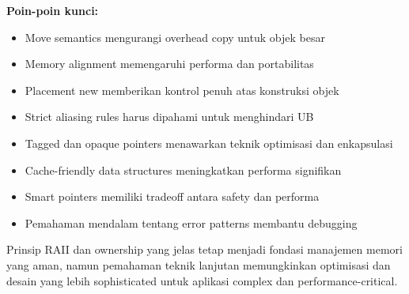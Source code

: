\documentclass[../main.tex]{subfiles}
\begin{document}
\textbf{Poin-poin kunci:}
\begin{itemize}
  \item Move semantics mengurangi overhead copy untuk objek besar
  \item Memory alignment memengaruhi performa dan portabilitas
  \item Placement new memberikan kontrol penuh atas konstruksi objek
  \item Strict aliasing rules harus dipahami untuk menghindari UB
  \item Tagged dan opaque pointers menawarkan teknik optimisasi dan enkapsulasi
  \item Cache-friendly data structures meningkatkan performa signifikan
  \item Smart pointers memiliki tradeoff antara safety dan performa
  \item Pemahaman mendalam tentang error patterns membantu debugging
\end{itemize}

Prinsip RAII dan ownership yang jelas tetap menjadi fondasi manajemen memori yang aman, namun pemahaman teknik lanjutan memungkinkan optimisasi dan desain yang lebih sophisticated untuk aplikasi complex dan performance-critical.
\end{document}
